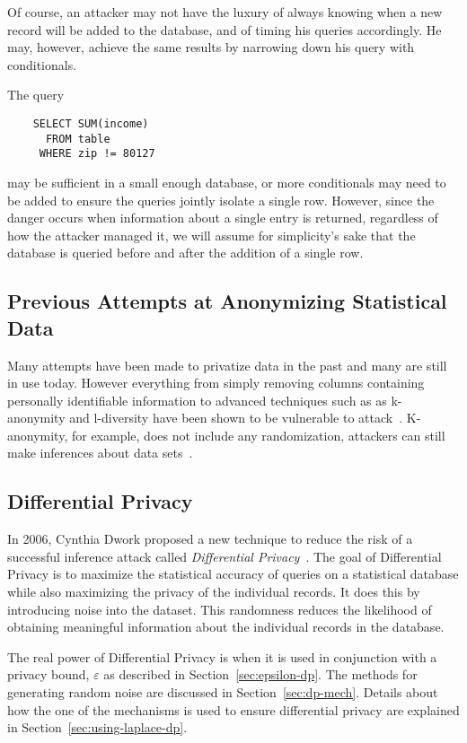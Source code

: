 \documentclass[conference,11pt]{IEEEtran}
\begin{document}
Of course, an attacker may not have the luxury of always knowing when a new
record will be added to the database, and of timing his queries accordingly. He
may, however, achieve the same results by narrowing down his query with
conditionals.

The query
\begin{verbatim}
    SELECT SUM(income)
      FROM table
     WHERE zip != 80127
\end{verbatim}
may be sufficient in a small enough database, or more conditionals may need to
be added to ensure the queries jointly isolate a single row. However, since the
danger occurs when information about a single entry is returned, regardless of
how the attacker managed it, we will assume for simplicity's sake that the
database is queried before and after the addition of a single row.

\subsection{Previous Attempts at Anonymizing Statistical Data}
Many attempts have been made to privatize data in the past and many are still in
use today. However everything from simply removing columns containing personally
identifiable information to advanced techniques such as as k-anonymity and
l-diversity have been shown to be vulnerable to attack~\cite{Atockar:2014}.
K-anonymity, for example, does not include any randomization, attackers can
still make inferences about data sets~\cite{Aggarwal:2005}.

\subsection{Differential Privacy}
In 2006, Cynthia Dwork proposed a new technique to reduce the risk of a
successful inference attack called \textit{Differential
    Privacy}~\cite{Hilton:DP:history}. The goal of Differential Privacy is to
maximize the statistical accuracy of queries on a statistical database while
also maximizing the privacy of the individual records. It does this by
introducing noise into the dataset. This randomness reduces the likelihood of
obtaining meaningful information about the individual records in the database.

The real power of Differential Privacy is when it is used in conjunction with a
privacy bound, $\varepsilon$ as described in Section~\ref{sec:epsilon-dp}. The
methods for generating random noise are discussed in Section~\ref{sec:dp-mech}.
Details about how the one of the mechanisms is used to ensure differential
privacy are explained in Section~\ref{sec:using-laplace-dp}.
\end{document}

